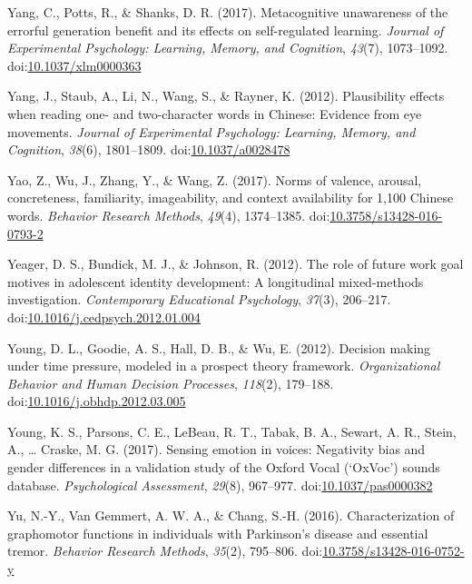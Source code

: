 \documentclass[english,man]{apa6}
\theoremstyle{definition}
\theoremstyle{definition}
\theoremstyle{definition}
\theoremstyle{remark}
\begin{document}
\hypertarget{ref-Yang2017}{}
Yang, C., Potts, R., \& Shanks, D. R. (2017). Metacognitive unawareness
of the errorful generation benefit and its effects on self-regulated
learning. \emph{Journal of Experimental Psychology: Learning, Memory,
and Cognition}, \emph{43}(7), 1073--1092.
doi:\href{https://doi.org/10.1037/xlm0000363}{10.1037/xlm0000363}

\hypertarget{ref-Yang2012}{}
Yang, J., Staub, A., Li, N., Wang, S., \& Rayner, K. (2012).
Plausibility effects when reading one- and two-character words in
Chinese: Evidence from eye movements. \emph{Journal of Experimental
Psychology: Learning, Memory, and Cognition}, \emph{38}(6), 1801--1809.
doi:\href{https://doi.org/10.1037/a0028478}{10.1037/a0028478}

\hypertarget{ref-Yao2017}{}
Yao, Z., Wu, J., Zhang, Y., \& Wang, Z. (2017). Norms of valence,
arousal, concreteness, familiarity, imageability, and context
availability for 1,100 Chinese words. \emph{Behavior Research Methods},
\emph{49}(4), 1374--1385.
doi:\href{https://doi.org/10.3758/s13428-016-0793-2}{10.3758/s13428-016-0793-2}

\hypertarget{ref-Yeager2012}{}
Yeager, D. S., Bundick, M. J., \& Johnson, R. (2012). The role of future
work goal motives in adolescent identity development: A longitudinal
mixed-methods investigation. \emph{Contemporary Educational Psychology},
\emph{37}(3), 206--217.
doi:\href{https://doi.org/10.1016/j.cedpsych.2012.01.004}{10.1016/j.cedpsych.2012.01.004}

\hypertarget{ref-Young2012}{}
Young, D. L., Goodie, A. S., Hall, D. B., \& Wu, E. (2012). Decision
making under time pressure, modeled in a prospect theory framework.
\emph{Organizational Behavior and Human Decision Processes},
\emph{118}(2), 179--188.
doi:\href{https://doi.org/10.1016/j.obhdp.2012.03.005}{10.1016/j.obhdp.2012.03.005}

\hypertarget{ref-Young2016}{}
Young, K. S., Parsons, C. E., LeBeau, R. T., Tabak, B. A., Sewart, A.
R., Stein, A., \ldots{} Craske, M. G. (2017). Sensing emotion in voices:
Negativity bias and gender differences in a validation study of the
Oxford Vocal (`OxVoc') sounds database. \emph{Psychological Assessment},
\emph{29}(8), 967--977.
doi:\href{https://doi.org/10.1037/pas0000382}{10.1037/pas0000382}

\hypertarget{ref-Yu2016}{}
Yu, N.-Y., Van Gemmert, A. W. A., \& Chang, S.-H. (2016).
Characterization of graphomotor functions in individuals with
Parkinson's disease and essential tremor. \emph{Behavior Research
Methods}, \emph{35}(2), 795--806.
doi:\href{https://doi.org/10.3758/s13428-016-0752-y}{10.3758/s13428-016-0752-y}
\end{document}
